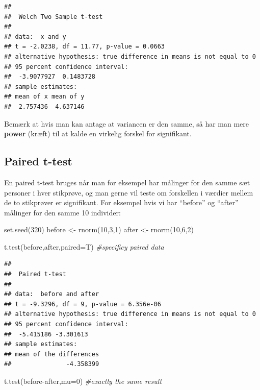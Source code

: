 \documentclass[
]{book}
\newenvironment{Shaded}{\begin{snugshade}}{\end{snugshade}}
\newcommand{\AttributeTok}[1]{\textcolor[rgb]{0.77,0.63,0.00}{#1}}
\newcommand{\CommentTok}[1]{\textcolor[rgb]{0.56,0.35,0.01}{\textit{#1}}}
\newcommand{\DecValTok}[1]{\textcolor[rgb]{0.00,0.00,0.81}{#1}}
\newcommand{\FunctionTok}[1]{\textcolor[rgb]{0.00,0.00,0.00}{#1}}
\newcommand{\NormalTok}[1]{#1}
\newcommand{\OtherTok}[1]{\textcolor[rgb]{0.56,0.35,0.01}{#1}}
\newcommand{\SpecialCharTok}[1]{\textcolor[rgb]{0.00,0.00,0.00}{#1}}
\begin{document}
\begin{verbatim}
## 
##  Welch Two Sample t-test
## 
## data:  x and y
## t = -2.0238, df = 11.77, p-value = 0.0663
## alternative hypothesis: true difference in means is not equal to 0
## 95 percent confidence interval:
##  -3.9077927  0.1483728
## sample estimates:
## mean of x mean of y 
##  2.757436  4.637146
\end{verbatim}

Bemærk at hvis man kan antage at variancen er den samme, så har man mere \textbf{power} (kræft) til at kalde en virkelig forskel for signifikant.

\hypertarget{paired-t-test}{%
\subsection{Paired t-test}\label{paired-t-test}}

En paired t-test bruges når man for eksempel har målinger for den samme sæt personer i hver stikprøve, og man gerne vil teste om forskellen i værdier mellem de to stikprøver er signifikant. For eksempel hvis vi har ``before'' og ``after'' målinger for den samme 10 individer:

\begin{Shaded}
\begin{Highlighting}[]
\FunctionTok{set.seed}\NormalTok{(}\DecValTok{320}\NormalTok{)}
\NormalTok{before }\OtherTok{\textless{}{-}} \FunctionTok{rnorm}\NormalTok{(}\DecValTok{10}\NormalTok{,}\DecValTok{3}\NormalTok{,}\DecValTok{1}\NormalTok{)}
\NormalTok{after }\OtherTok{\textless{}{-}} \FunctionTok{rnorm}\NormalTok{(}\DecValTok{10}\NormalTok{,}\DecValTok{6}\NormalTok{,}\DecValTok{2}\NormalTok{)}

\FunctionTok{t.test}\NormalTok{(before,after,}\AttributeTok{paired=}\NormalTok{T) }\CommentTok{\#specificy paired data}
\end{Highlighting}
\end{Shaded}

\begin{verbatim}
## 
##  Paired t-test
## 
## data:  before and after
## t = -9.3296, df = 9, p-value = 6.356e-06
## alternative hypothesis: true difference in means is not equal to 0
## 95 percent confidence interval:
##  -5.415186 -3.301613
## sample estimates:
## mean of the differences 
##               -4.358399
\end{verbatim}

\begin{Shaded}
\begin{Highlighting}[]
\FunctionTok{t.test}\NormalTok{(before}\SpecialCharTok{{-}}\NormalTok{after,}\AttributeTok{mu=}\DecValTok{0}\NormalTok{) }\CommentTok{\#exactly the same result}
\end{Highlighting}
\end{Shaded}
\end{document}
